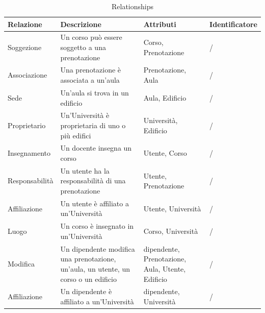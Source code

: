 \documentclass[a4paper, 10pt, oneside]{article} %
\begin{document}
\begin{table}[H]
\begin{tabular}{m{3cm} | m{6cm}| m{3cm} | m{2.5cm} }

\textbf{Relazione} & \textbf{Descrizione} & \textbf{Attributi} & \textbf{Identificatore}\\

\hline

Soggezione & Un corso può essere soggetto a una prenotazione & Corso, Prenotazione & / \\

\hline

Associazione & Una prenotazione è associata a un'aula & Prenotazione, Aula & /  \\

\hline

Sede & Un'aula si trova in un edificio & Aula, Edificio &   / \\

\hline

Proprietario & Un'Università è proprietaria di uno o più edifici & Università, Edificio & / \\

\hline

Insegnamento & Un docente insegna un corso & Utente, Corso & / \\

\hline

Responsabilità& Un utente ha la responsabilità di una prenotazione & Utente, Prenotazione & / \\

\hline

Affiliazione & Un utente è affiliato a un'Università & Utente, Università & / \\

\hline

Luogo & Un corso è insegnato in un'Università & Corso, Università & / \\

\hline

Modifica & Un dipendente modifica una prenotazione, un'aula, un utente, un corso o un edificio & dipendente, Prenotazione, Aula, Utente, Edificio & / \\

\hline

Affiliazione & Un dipendente è affiliato a un'Università & dipendente, Università & /

\end{tabular}
\caption{Relationships}

\end{table}
\end{document}
